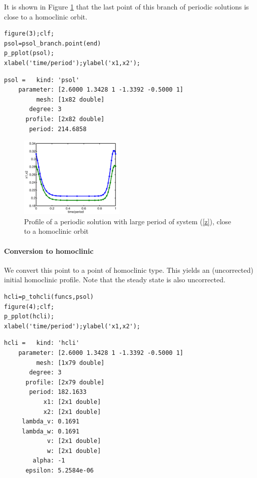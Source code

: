 \documentclass[10pt]{scrartcl}
\begin{document}
It is shown in Figure \ref{demo3-3} that the last point of this branch
of periodic solutions is close to a homoclinic orbit.  
\begin{lstlisting}
figure(3);clf;
psol=psol_branch.point(end)
p_pplot(psol);
xlabel('time/period');ylabel('x1,x2');
\end{lstlisting}
{\small
\begin{verbatim}
psol =   kind: 'psol'
    parameter: [2.6000 1.3428 1 -1.3392 -0.5000 1]
         mesh: [1x82 double]
       degree: 3
      profile: [2x82 double]
       period: 214.6858
\end{verbatim}
\begin{figure}[ht]
\begin{center}
\includegraphics[width=0.45\textwidth]{fig/hom_demfig03}
\caption{\label{demo3-3}Profile of a periodic solution with large period of
system (\ref{z}), close
to a homoclinic orbit}
\end{center}
\end{figure}

\paragraph{Conversion to homoclinic}
We convert this point to a point of homoclinic type. This yields an 
(uncorrected) initial homoclinic profile.  Note that the steady state is also 
uncorrected.
\begin{lstlisting}
hcli=p_tohcli(funcs,psol)
figure(4);clf;
p_pplot(hcli);
xlabel('time/period');ylabel('x1,x2');
\end{lstlisting}
{\small
\begin{verbatim}
hcli =   kind: 'hcli'
    parameter: [2.6000 1.3428 1 -1.3392 -0.5000 1]
         mesh: [1x79 double]
       degree: 3
      profile: [2x79 double]
       period: 182.1633
           x1: [2x1 double]
           x2: [2x1 double]
     lambda_v: 0.1691
     lambda_w: 0.1691
            v: [2x1 double]
            w: [2x1 double]
        alpha: -1
      epsilon: 5.2584e-06
\end{verbatim}
}
}
\end{document}
